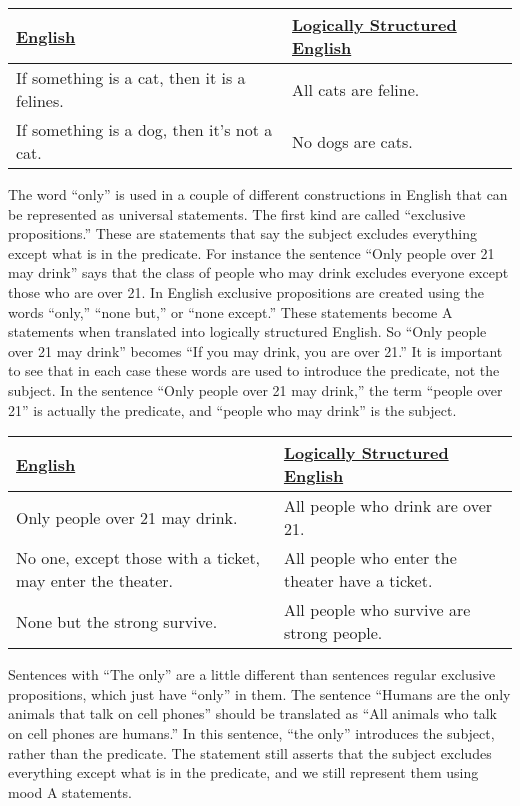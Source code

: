 \begin{table}
\begin{longtabu}{p{.5\linewidth}p{.5\linewidth}}
\underline{English} & \underline{Logically Structured English} \\
\endhead
If something is a cat, then it is a felines. & All cats are feline.\\
If something is a dog, then it's not a cat. & No dogs are cats. \\
\end{longtabu}
\end{table}

The word ``only'' is used in a couple of different constructions in English that can be represented as universal statements. The first kind are called ``exclusive propositions.'' These are statements that say the subject excludes everything except what is in the predicate. For instance the sentence ``Only people over 21 may drink'' says that the class of people who may drink excludes everyone except those who are over 21. In English exclusive propositions are created using the words ``only,'' ``none but,'' or ``none except.'' These statements become A statements when translated into logically structured English. So ``Only people over 21 may drink'' becomes ``If you may drink, you  are over 21.'' It is important to see that in each case these words are used to introduce the predicate, not the subject. In the sentence ``Only people over 21 may drink,'' the term ``people over 21'' is actually the  predicate, and ``people who may drink'' is the subject.

\begin{table}
\begin{longtabu}{p{.5\linewidth}p{.5\linewidth}}
\underline{English} & \underline{Logically Structured English} \\
\endhead
Only people over 21 may drink. & All people who drink are over 21.\\
No one, except those with a ticket, may enter the theater. & All people who enter the theater have a ticket. \\
None but the strong survive. & All people who survive are strong people. \\
\end{longtabu}
\end{table}

Sentences with ``The only'' are a little different than sentences regular exclusive propositions, which just have ``only'' in them. The sentence ``Humans are the only animals that talk on cell phones'' should be translated as ``All animals who talk on cell phones are humans.'' In this sentence, ``the only'' introduces the subject, rather than the predicate. The statement still asserts that the subject excludes everything except what is in the predicate, and we still represent them using mood A statements.

